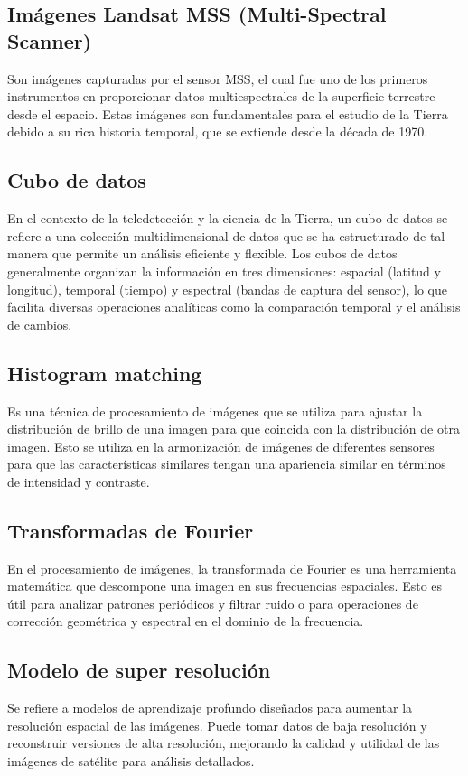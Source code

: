             \subsection{Imágenes Landsat MSS (Multi-Spectral Scanner)}
                Son imágenes capturadas por el sensor MSS, el cual fue uno de los primeros instrumentos en proporcionar datos multiespectrales de la superficie terrestre desde el espacio. Estas imágenes son fundamentales para el estudio de la Tierra debido a su rica historia temporal, que se extiende desde la década de 1970.
                
            \subsection{Cubo de datos}
                En el contexto de la teledetección y la ciencia de la Tierra, un cubo de datos se refiere a una colección multidimensional de datos que se ha estructurado de tal manera que permite un análisis eficiente y flexible. Los cubos de datos generalmente organizan la información en tres dimensiones: espacial (latitud y longitud), temporal (tiempo) y espectral (bandas de captura del sensor), lo que facilita diversas operaciones analíticas como la comparación temporal y el análisis de cambios.
                
            \subsection{Histogram matching}
                Es una técnica de procesamiento de imágenes que se utiliza para ajustar la distribución de brillo de una imagen para que coincida con la distribución de otra imagen. Esto se utiliza en la armonización de imágenes de diferentes sensores para que las características similares tengan una apariencia similar en términos de intensidad y contraste.
                
            \subsection{Transformadas de Fourier}
                En el procesamiento de imágenes, la transformada de Fourier es una herramienta matemática que descompone una imagen en sus frecuencias espaciales. Esto es útil para analizar patrones periódicos y filtrar ruido o para operaciones de corrección geométrica y espectral en el dominio de la frecuencia.
                
            \subsection{Modelo de super resolución}
                Se refiere a modelos de aprendizaje profundo diseñados para aumentar la resolución espacial de las imágenes. Puede tomar datos de baja resolución y reconstruir versiones de alta resolución, mejorando la calidad y utilidad de las imágenes de satélite para análisis detallados.
            
